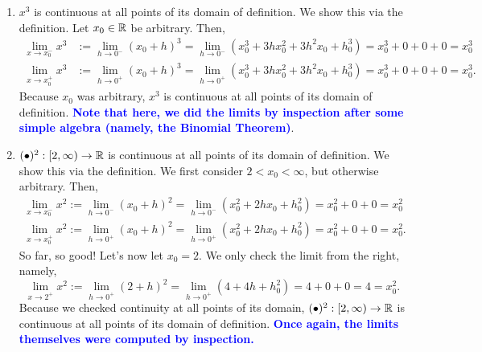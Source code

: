 \begin{enumerate}
\renewcommand{\labelenumi}{(\alph{enumi})}
\setlength{\itemsep}{.2cm}
    \item \Ans $x^3$ is continuous at all points of its domain of definition. We show this via the definition. Let $x_0 \in \mathbb R$ be arbitrary. Then, 
    \begin{align*}
       \lim_{x \to x_0^-} x^3&:=  \lim_{h \to 0^-} (x_0+h)^3  =  \lim_{h \to 0^-} \left( x_0^3 + 3 h x_0^2 + 3 h^2 x_0 + h_0^3\right) = x_0^3 + 0 + 0 + 0=  x_0^3\\
        \lim_{x \to x_0^+} x^3 &:=  \lim_{h \to 0^+} (x_0+h)^3  =  \lim_{h \to 0^+} \left( x_0^3 + 3 h x_0^2 + 3 h^2 x_0 + h_0^3\right) = x_0^3 + 0 + 0 + 0=  x_0^3.
    \end{align*}
    Because $x_0$ was arbitrary, $x^3$ is continuous at all points of its domain of definition.  \textcolor{blue}{\bf Note that here, we did the limits by inspection after some simple algebra (namely, the Binomial Theorem)}.

    \item \Ans $(\bullet)^2:[2, \infty) \to \mathbb R$ is continuous at all points of its domain of definition. We show this via the definition. We first consider $2 < x_0 < \infty$, but otherwise arbitrary. Then, 
    \begin{align*}
       \lim_{x \to x_0^-} x^2:=  \lim_{h \to 0^-} (x_0+h)^2  =  \lim_{h \to 0^-} \left( x_0^2 + 2 h x_0 + h_0^2\right) = x_0^2 + 0 + 0 =  x_0^2\\
        \lim_{x \to x_0^+} x^2:=  \lim_{h \to 0^+} (x_0+h)^2  =  \lim_{h \to 0^+} \left( x_0^2 + 2 h x_0 + h_0^2\right) = x_0^2 + 0 + 0 =  x_0^2.
    \end{align*}
    So far, so good! Let's now let $x_0=2$. We only check the limit from the right, namely,
    $$ \lim_{x \to 2^+} x^2:=  \lim_{h \to 0^+} (2+h)^2  =  \lim_{h \to 0^+} \left( 4 + 4 h  + h_0^2\right) = 4 + 0 + 0 =  4 = x_0^2. $$
    Because we checked continuity at all points of its domain, $(\bullet)^2:[2, \infty) \to \mathbb R$ is continuous at all points of its domain of definition. \textcolor{blue}{\bf Once again, the limits themselves were computed by inspection.} 


\end{enumerate}
